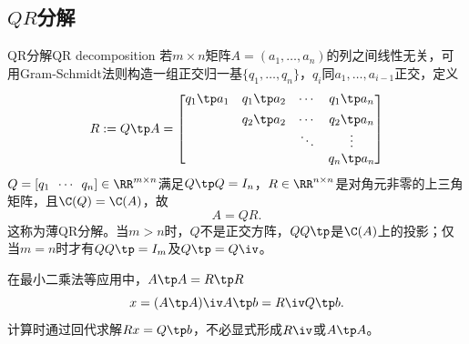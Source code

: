\subsection{\texorpdfstring{$QR$}{QR}分解}

\begin{theorem}{QR分解}{QR decomposition}
	若$m\times n$矩阵$A=(a_1,\ldots,a_n)$的列之间线性无关，可用Gram-Schmidt法则构造一组正交归一基$\{q_1,\ldots,q_n\}$，$q_i$同$a_1,\ldots,a_{i-1}$正交，定义
	\[
		R:=Q\tp A=\begin{bmatrix}
			q_1\tp a_1&q_1\tp a_2&\cdots&q_1\tp a_n\\[1ex]
			&q_2\tp a_2&\cdots&q_2\tp a_n\\
			&&\ddots&\vdots\\
			&&&q_n\tp a_n
		\end{bmatrix}
	\]
	$Q=[q_1\enspace\cdots\enspace q_n]\in\RR^{m\times n}$满足$Q\tp Q=I_n$，$R\in\RR^{n\times n}$是对角元非零的上三角矩阵，且$\C(Q)=\C(A)$，故
	\begin{equation}
		A=QR.
	\end{equation}
	这称为薄QR分解。当$m>n$时，$Q$不是正交方阵，$QQ\tp$是$\C(A)$上的投影；仅当$m=n$时才有$QQ\tp=I_m$及$Q\tp=Q\iv$。
\end{theorem}

\begin{remark}
	在最小二乘法等应用中，$A\tp A=R\tp R$
	\[
		x=(A\tp A)\iv A\tp b=R\iv Q\tp b.
	\]
	计算时通过回代求解$Rx=Q\tp b$，不必显式形成$R\iv$或$A\tp A$。
\end{remark}
